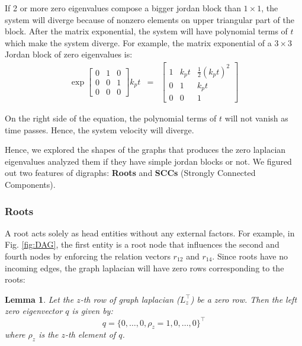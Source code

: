 \documentclass[letterpaper, 10 pt, conference]{ieeeconf}  %
\newtheorem{lemma}[theorem]{Lemma}
\begin{document}
If 2 or more zero eigenvalues compose a bigger jordan block than \(1 \times 1\), the system will diverge because of nonzero elements on upper triangular part of the block. After the matrix exponential, the system will have polynomial terms of \(t\) which make the system diverge. For example, the matrix exponential of a \(3 \times 3\) Jordan block of zero eigenvalues is:
\[
\begin{matrix}
    \exp{\begin{bmatrix}
        0 & 1 & 0 \\
        0 & 0 & 1 \\
        0 & 0 & 0
    \end{bmatrix} k_p t} & = & 
    \begin{bmatrix}
        1 & k_p t & \frac{1}{2} (k_p t)^2 \\
        0 & 1 & k_p t \\
        0 & 0 & 1
    \end{bmatrix}
\end{matrix}
\]

On the right side of the equation, the polynomial terms of \(t\) will not vanish as time passes. Hence, the system velocity will diverge.

Hence, we explored the shapes of the graphs that produces the zero laplacian eigenvalues analyzed them if they have simple jordan blocks or not. We figured out two features of digraphs: \textbf{Roots} and \textbf{SCCs} (Strongly Connected Components).

\subsubsection{Roots}
A root acts solely as head entities without any external factors. For example, in Fig. \ref{fig:DAG}, the first entity is a root node that influences the second and fourth nodes by enforcing the relation vectors \( r_{12} \) and \( r_{14} \). Since roots have no incoming edges, the graph laplacian will have zero rows corresponding to the roots:

\begin{lemma}\label{lemma:q}
Let the \( z \)-th row of graph laplacian (\( L_z^\top\)) be a zero row. Then the left zero eigenvector \( q \) is given by:
\begin{equation}\label{eq:q}
    q = \{0, \dots, 0, \rho_z = 1, 0, \dots, 0\}^\top
\end{equation}
\noindent where \( \rho_z \) is the \( z \)-th element of \( q \).
\end{lemma}
\end{document}
